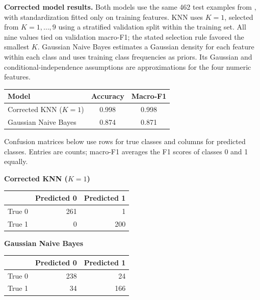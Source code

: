 \documentclass[12pt]{article}
\begin{document}
\begin{enumerate}
\clearpage
\noindent\textbf{Corrected model results.}
Both models use the same 462 test examples from , with
standardization fitted only on training features. KNN uses $K=1$, selected
from $K=1,\ldots,9$ using a stratified validation split within the training
set. All nine values tied on validation macro-F1; the stated selection rule
favored the smallest $K$. Gaussian Naive Bayes estimates a Gaussian density
for each feature within each class and uses training class frequencies as
priors. Its Gaussian and conditional-independence assumptions are approximations
for the four numeric features.

\begin{center}
\begin{tabular}{lcc}
\hline
Model & Accuracy & Macro-F1 \\
\hline
Corrected KNN ($K=1$) & 0.998 & 0.998 \\
Gaussian Naive Bayes & 0.874 & 0.871 \\
\hline
\end{tabular}
\end{center}

\noindent Confusion matrices below use rows for true classes and columns for
predicted classes. Entries are counts; macro-F1 averages the F1 scores of
classes 0 and 1 equally.

\begin{center}
\begin{minipage}{0.48\linewidth}
\centering
\textbf{Corrected KNN ($K=1$)}\par\medskip
\begin{tabular}{lrr}
\hline
 & Predicted 0 & Predicted 1 \\
\hline
True 0 & 261 & 1 \\
True 1 & 0 & 200 \\
\hline
\end{tabular}
\end{minipage}\hfill
\begin{minipage}{0.48\linewidth}
\centering
\textbf{Gaussian Naive Bayes}\par\medskip
\begin{tabular}{lrr}
\hline
 & Predicted 0 & Predicted 1 \\
\hline
True 0 & 238 & 24 \\
True 1 & 34 & 166 \\
\hline
\end{tabular}
\end{minipage}
\end{center}


\end{enumerate}
\end{document}
